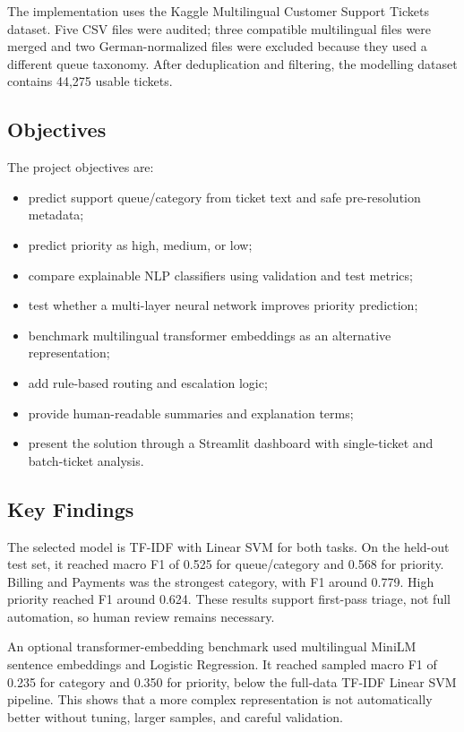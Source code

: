 \documentclass[11pt,a4paper]{article}
\begin{document}
The implementation uses the Kaggle Multilingual Customer Support Tickets dataset. Five CSV files were audited; three compatible multilingual files were merged and two German-normalized files were excluded because they used a different queue taxonomy. After deduplication and filtering, the modelling dataset contains 44,275 usable tickets.

\subsection{Objectives}
The project objectives are:
\begin{itemize}
  \item predict support queue/category from ticket text and safe pre-resolution metadata;
  \item predict priority as high, medium, or low;
  \item compare explainable NLP classifiers using validation and test metrics;
  \item test whether a multi-layer neural network improves priority prediction;
  \item benchmark multilingual transformer embeddings as an alternative representation;
  \item add rule-based routing and escalation logic;
  \item provide human-readable summaries and explanation terms;
  \item present the solution through a Streamlit dashboard with single-ticket and batch-ticket analysis.
\end{itemize}

\subsection{Key Findings}
The selected model is TF-IDF with Linear SVM for both tasks. On the held-out test set, it reached macro F1 of 0.525 for queue/category and 0.568 for priority. Billing and Payments was the strongest category, with F1 around 0.779. High priority reached F1 around 0.624. These results support first-pass triage, not full automation, so human review remains necessary.

An optional transformer-embedding benchmark used multilingual MiniLM sentence embeddings and Logistic Regression. It reached sampled macro F1 of 0.235 for category and 0.350 for priority, below the full-data TF-IDF Linear SVM pipeline. This shows that a more complex representation is not automatically better without tuning, larger samples, and careful validation.
\end{document}
